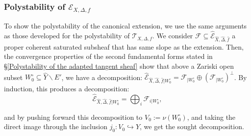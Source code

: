 \documentclass[12pt,a4paper]{amsart}
\theoremstyle{plain}
\theoremstyle{definition}
\begin{document}
\subsubsection{Polystability of $\mathcal{E}_{X, \Delta, f}$}

To show the polystability of the canonical extension, we use the same arguments as those developed for the polystability of $\mathcal{T}_{X, \Delta, f}$. We consider $\mathcal{F} \subseteq \widehat{\mathcal{E}}_{\widehat{X}, \widehat{\Delta}, \widehat{f}}$ a proper coherent saturated subsheaf that has same slope as the extension. Then, the convergence properties of the second fundamental forms stated in \S\ref{Polystability of the adapted tangent sheaf} show that above a Zariski open subset $W_0^\circ \subseteq \widehat{Y} \backslash E'$, we have a decomposition: $\widehat{\mathcal{E}}_{\widehat{X}, \widehat{\Delta}, \widehat{f} |W_0^\circ} = \mathcal{F}_{|W_0^\circ} \oplus (\mathcal{F}_{|W_0^\circ})^\perp$. By induction, this produces a decomposition:
$$
\widehat{\mathcal{E}}_{\widehat{X}, \widehat{\Delta}, \widehat{f} |W_0^\circ} = \bigoplus_i \mathcal{F}_{i |W_0^\circ},
$$ 

and by pushing forward this decomposition to $V_0 := \nu(W_0^\circ)$, and taking the direct image through the inclusion $j_0 : V_0 \hookrightarrow Y$, we get the sought decomposition.

\printbibliography
\end{document}

